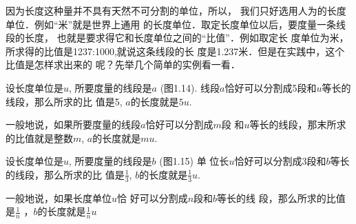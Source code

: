 因为长度这种量并不具有天然不可分割的单位，所以，
我们只好选用人为的长度单位．例如“米”就是世界上通用
的长度单位．取定长度单位以后，要度量一条线段的长度，
也就是要求得它和长度单位之间的“比值”．例如取定长
度单位为米，所求得的比值是1237:1000,就说这条线段的长
度是1.237米．但是在实践中，这个比值是怎样求出来的
呢？先举几个简单的实例看一看．

\begin{example}
设长度单位是$u$, 所要度量的线段是$a$ (图1.14).
线段$a$恰好可以分割成5段和$u$等长的线段，那么所求的比
值是5, $a$的长度就是$5u$. 

一般地说，如果所要度量的线段$a$恰好可以分割成$m$段
和$u$等长的线段，那末所求的比值就是整数$m$, $a$的长度就是$mu$.
\end{example}

\begin{figure}[htp]\centering
    \begin{minipage}[t]{0.48\textwidth}
    \centering
{}
    \caption{}
    \end{minipage}
    \begin{minipage}[t]{0.48\textwidth}
    \centering
    \caption{}
    \end{minipage}
    \end{figure}

\begin{example}
设长度单位是$u$, 所要度量的线段是$b$ (图1.15) 单
位长$u$恰好可以分割成3段和$b$等长的线段，那么所求的比
值是$\frac{1}{3}$, $b$的长度就是$\frac{1}{3}u$. 

一般地说，如果长度单位$u$恰
好可以分割成$n$段和$b$等长的线
段，那么所求的比值是$\frac{1}{n}$
，$b$的长度就是$\frac{1}{n}u$
\end{example}

